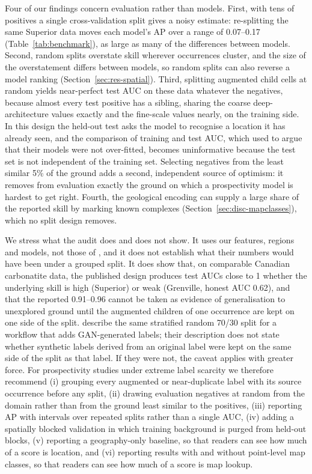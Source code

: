 \documentclass[pdflatex,sn-apa]{sn-jnl}
\begin{document}
Four of our findings concern evaluation rather than models. First, with tens of positives a single cross-validation split gives a noisy estimate: re-splitting the same Superior data moves each model's AP over a range of 0.07--0.17 (Table~\ref{tab:benchmark}), as large as many of the differences between models. Second, random splits overstate skill wherever occurrences cluster, and the size of the overstatement differs between models, so random splits can also reverse a model ranking (Section~\ref{sec:res-spatial}). Third, splitting augmented child cells at random yields near-perfect test AUC on these data whatever the negatives, because almost every test positive has a sibling, sharing the coarse deep-architecture values exactly and the fine-scale values nearly, on the training side. In this design the held-out test asks the model to recognise a location it has already seen, and the comparison of training and test AUC, which \citet{Parsa2024} used to argue that their models were not over-fitted, becomes uninformative because the test set is not independent of the training set. Selecting negatives from the least similar 5\% of the ground adds a second, independent source of optimism: it removes from evaluation exactly the ground on which a prospectivity model is hardest to get right. Fourth, the geological encoding can supply a large share of the reported skill by marking known complexes (Section~\ref{sec:disc-mapclasses}), which no split design removes.

We stress what the audit does and does not show. It uses our features, regions and models, not those of \citet{Parsa2024}, and it does not establish what their numbers would have been under a grouped split. It does show that, on comparable Canadian carbonatite data, the published design produces test AUCs close to 1 whether the underlying skill is high (Superior) or weak (Grenville, honest AUC 0.62), and that the reported 0.91--0.96 cannot be taken as evidence of generalisation to unexplored ground until the augmented children of one occurrence are kept on one side of the split. \citet{Parsa2025} describe the same stratified random 70/30 split for a workflow that adds GAN-generated labels; their description does not state whether synthetic labels derived from an original label were kept on the same side of the split as that label. If they were not, the caveat applies with greater force. For prospectivity studies under extreme label scarcity we therefore recommend (i) grouping every augmented or near-duplicate label with its source occurrence before any split, (ii) drawing evaluation negatives at random from the domain rather than from the ground least similar to the positives, (iii) reporting AP with intervals over repeated splits rather than a single AUC, (iv) adding a spatially blocked validation in which training background is purged from held-out blocks, (v) reporting a geography-only baseline, so that readers can see how much of a score is location, and (vi) reporting results with and without point-level map classes, so that readers can see how much of a score is map lookup.
\end{document}
